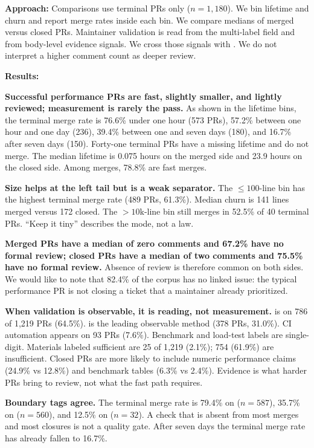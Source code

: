 \noindent\textbf{Approach:} Comparisons use terminal PRs only (\(n=1{,}180\)). We bin lifetime and churn and report merge rates inside each bin. We compare medians of merged versus closed PRs. Maintainer validation is read from the multi-label field  and from body-level evidence signals. We cross those signals with . We do not interpret a higher comment count as deeper review.

\noindent\textbf{Results:} 

\textbf{Successful performance PRs are fast, slightly smaller, and lightly reviewed; measurement is rarely the pass.} As shown in the lifetime bins, the terminal merge rate is 76.6\% under one hour (573 PRs), 57.2\% between one hour and one day (236), 39.4\% between one and seven days (180), and 16.7\% after seven days (150). Forty-one terminal PRs have a missing lifetime and do not merge. The median lifetime is 0.075 hours on the merged side and 23.9 hours on the closed side. Among merges, 78.8\% are fast merges.

\textbf{Size helps at the left tail but is a weak separator.} The \(\leq 100\)-line bin has the highest terminal merge rate (489 PRs, 61.3\%). Median churn is 141 lines merged versus 172 closed. The \(>10\)k-line bin still merges in 52.5\% of 40 terminal PRs. ``Keep it tiny'' describes the mode, not a law.

\textbf{Merged PRs have a median of zero comments and 67.2\% have no formal review; closed PRs have a median of two comments and 75.5\% have no formal review.} Absence of review is therefore common on both sides. We would like to note that 82.4\% of the corpus has no linked issue: the typical performance PR is not closing a ticket that a maintainer already prioritized.

\textbf{When validation is observable, it is reading, not measurement.}  is  on 786 of 1{,}219 PRs (64.5\%).  is the leading observable method (378 PRs, 31.0\%). CI automation appears on 93 PRs (7.6\%). Benchmark and load-test labels are single-digit. Materials labeled sufficient are 25 of 1{,}219 (2.1\%); 754 (61.9\%) are insufficient. Closed PRs are more likely to include numeric performance claims (24.9\% vs 12.8\%) and benchmark tables (6.3\% vs 2.4\%). Evidence is what harder PRs bring to review, not what the fast path requires.

\textbf{Boundary tags agree.} The terminal merge rate is 79.4\% on  (\(n=587\)), 35.7\% on  (\(n=560\)), and 12.5\% on  (\(n=32\)). A check that is absent from most merges and most closures is not a quality gate. After seven days the terminal merge rate has already fallen to 16.7\%.

